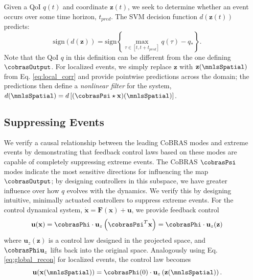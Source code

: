 \documentclass[twocolumn,10pt]{article}
\begin{document}
Given a QoI $q(t)$ and coordinate $\mathbf z(t)$, we seek to determine whether an event occurs over some time horizon, $t_{pred}$. The SVM decision function $d(\mathbf z(t))$ predicts:
%
\begin{equation}
\text{sign} \left(   d(\mathbf z) \right)= \text{sign}\left\{\max_{\tau \in [t, t+t_{pred}]} q(\tau) -q_*   \right\}.
\end{equation}
%
Note that the QoI $q$ in this definition can be different from the one defining $\cobrasOutput$. For localized events, we simply replace $\mathbf z$ with $\mathbf {z}(\mnlsSpatial)$ from Eq. \ref{eq:local_corr} and provide pointwise predictions across the domain; the predictions then define a \textit{nonlinear filter} for the system,
$d(\mnlsSpatial) = d\left[(\cobrasPsi \star \mathbf x)(\mnlsSpatial)\right]$.

\subsection{Suppressing Events}
\label{sec:methods_suppression}
We verify a causal relationship between the leading CoBRAS modes and extreme events by demonstrating that feedback control laws based on these modes are capable of completely suppressing extreme events.
The CoBRAS $\cobrasPsi$ modes indicate the most sensitive directions for influencing the map $\cobrasOutput$; by designing controllers in this subspace, we have greater influence over how $q$ evolves with the dynamics.
We verify this by designing intuitive, minimally actuated controllers to suppress extreme events.
For the control dynamical system, $\mathbf{\dot x} = \mathbf{F}(\mathbf x) + \mathbf u$, we provide feedback control 
\begin{equation}
    \mathbf u(\mathbf{x}) = \cobrasPhi \cdot  \mathbf{u}_z \left(\cobrasPsi^T \mathbf x \right) = \cobrasPhi \cdot  \mathbf u_z(\mathbf z)
\end{equation}
where $\mathbf u_z(\mathbf z)$ is a control law designed in the projected space, and $\cobrasPhi \mathbf u _z$ lifts back into the original space. Analogously using Eq. \ref{eq:global_recon} for localized events, the control law becomes 
\begin{equation}
    \mathbf u(\mathbf x(\mnlsSpatial)) 
    = \cobrasPhi(0) \cdot \mathbf u_z\left(\mathbf z(\mnlsSpatial)\right).
\end{equation}
\end{document}

